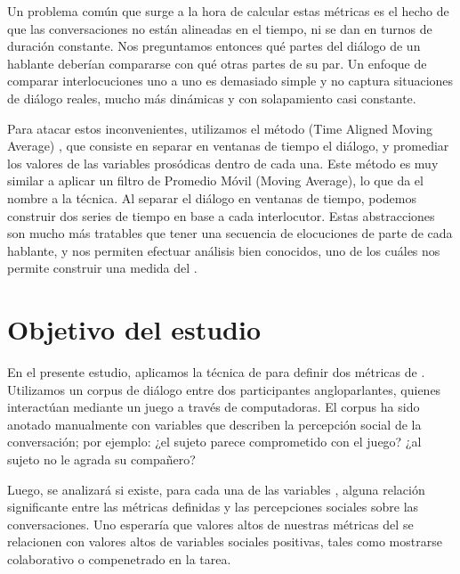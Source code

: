 Un problema común que surge a la hora de calcular estas métricas es el hecho de que las conversaciones no están alineadas en el tiempo, ni se dan en turnos de duración constante. Nos preguntamos entonces qué partes del diálogo de un hablante deberían compararse con qué otras partes de su par. Un enfoque de comparar interlocuciones uno a uno es demasiado simple y no captura situaciones de diálogo reales, mucho más dinámicas y con solapamiento casi constante.

Para atacar estos inconvenientes, utilizamos el método \TAMA(Time Aligned Moving Average) \cite{KOU2008}, que consiste en separar en ventanas de tiempo el diálogo, y promediar los valores de las variables prosódicas dentro de cada una. Este método es muy similar a aplicar un filtro de Promedio Móvil (Moving Average), lo que da el nombre a la técnica. Al separar el diálogo en ventanas de tiempo, podemos construir dos series de tiempo en base a cada interlocutor. Estas abstracciones son mucho más tratables que tener una secuencia de elocuciones de parte de cada hablante, y nos permiten efectuar análisis bien conocidos, uno de los cuáles nos permite construir una medida del \entrainment.






\section{Objetivo del estudio}

En el presente estudio, aplicamos la técnica de \TAMA para definir dos métricas de \entrainment. Utilizamos un corpus de diálogo entre dos participantes angloparlantes, quienes interactúan mediante un juego a través de computadoras. El corpus ha sido anotado manualmente con variables que describen la percepción social de la conversación; por ejemplo: ¿el sujeto parece comprometido con el juego? ¿al sujeto no le agrada su compañero?

Luego, se analizará si existe, para cada una de las variables \ap,  alguna relación significante entre las métricas definidas y las percepciones sociales sobre las conversaciones. Uno esperaría que valores altos de nuestras métricas del \entrainment se relacionen con valores altos de variables sociales positivas, tales como mostrarse colaborativo o compenetrado en la tarea.
